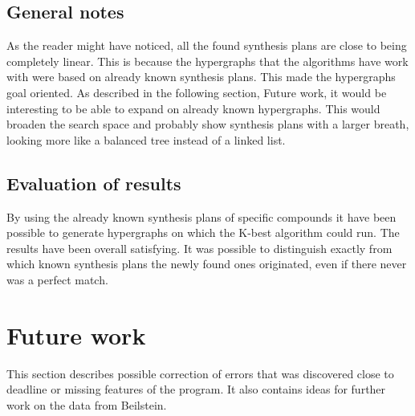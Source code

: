 \documentclass[a4paper,10pt,titlepage]{paper}
\begin{document}
\subsection{General notes}
As the reader might have noticed, all the found synthesis plans are close to being completely linear. This is because the hypergraphs that the algorithms have work with were based on already known synthesis plans. This made the hypergraphs goal oriented. As described in the following section, Future work, it would be interesting to be able to expand on already known hypergraphs. This would broaden the search space and probably show synthesis plans with a larger breath, looking more like a balanced tree instead of a linked list.

\subsection{Evaluation of results}
By using the already known synthesis plans of specific compounds it have been possible to generate hypergraphs on which the K-best algorithm could run. The results have been overall satisfying. It was possible to distinguish exactly from which known synthesis plans the newly found ones originated, even if there never was a perfect match. 

\section{Future work}
\label{sec::FutureWork}
This section describes possible correction of errors that was discovered close to deadline or missing features of the program. It also contains ideas for further work on the data from Beilstein.
\end{document}
